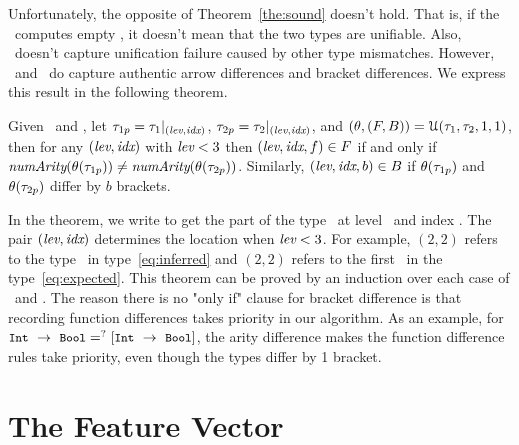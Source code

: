 \documentclass[12pt]{report}	%
\begin{document}
Unfortunately, the opposite of Theorem~\ref{the:sound} doesn't hold.
That is, if the \ualg\ computes empty \td, it doesn't mean that
the two types are unifiable. Also, \td\ doesn't capture unification
failure caused by other type mismatches. However, \ualg\ and
\dalg\ do capture authentic arrow differences and bracket differences.
We express this result in the following theorem.
%
\begin{theorem}
Given \mtf\ and \mts, let $\tau_{1p} = \tau_1|_{(\textit{lev},\textit{idx})}$,
$\tau_{2p} = \tau_2|_{(\textit{lev},\textit{idx})}$, and $(\theta,(F,B)) = \mathcal U(\tau_1,\tau_2,1,1)$, then for any $(\textit{lev},\textit{idx})$ with $\textit{lev} < 3$  then $(\textit{lev},\textit{idx},f) \in F$ if and only if $\textit{numArity}(\theta(\tau_{1p})) \neq \textit{numArity}(\theta(\tau_{2p}))$. Similarly, $(\textit{lev},\textit{idx},b) \in B$ if  $\theta(\tau_{1p})$ and $\theta(\tau_{2p})$ differ by $b$ brackets.
%
\end{theorem}
%
In the theorem, we write \restrict{\mt}{(\level,\idx)} to get the
part of the type \mt\ at level \level\ and index \idx. The pair $(\textit{lev},\textit{idx})$
determines the location when $\textit{lev} < 3$. For example, $(2,2)$ refers to the type
\Bool\ in type~\eqref{eq:inferred} and $(2,2)$ refers to the first \Int\ in
the type~\eqref{eq:expected}.
%
This theorem can be proved by an induction over each case of \ualg\ and \dalg. The reason there is no "only if"
clause for bracket difference is that
recording function differences takes
priority in our algorithm. As an
example, for ${\small\texttt{Int}}\ \to\ {\small\texttt{Bool}} =^?
[{\small\texttt{Int}}\ \to\ {\small\texttt{Bool}}]$, the arity
difference makes the function
difference rules take priority, even
though the types differ by 1 bracket.

\section{The Feature Vector}
\label{sec:features:feature}
\end{document}
